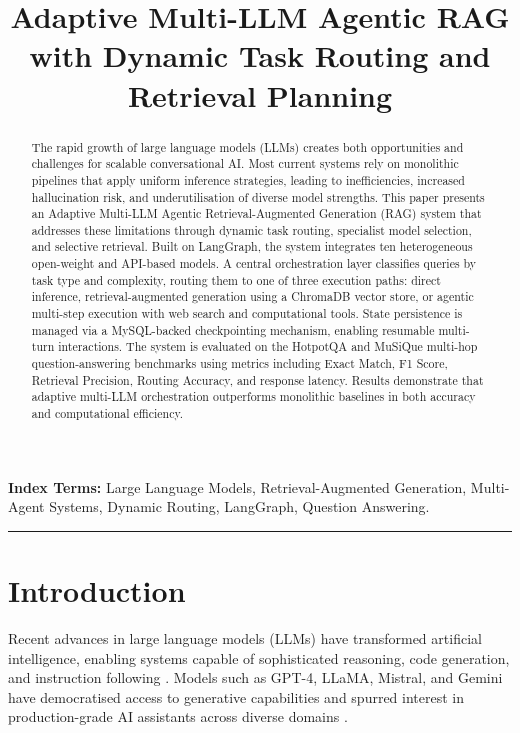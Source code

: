 \documentclass[12pt,a4paper]{article}
\title{
\textbf{Adaptive Multi-LLM Agentic RAG with Dynamic Task Routing and Retrieval Planning}
}
\begin{document}
\maketitle

\begin{abstract}
The rapid growth of large language models (LLMs) creates both opportunities and challenges for scalable conversational AI. Most current systems rely on monolithic pipelines that apply uniform inference strategies, leading to inefficiencies, increased hallucination risk, and underutilisation of diverse model strengths. This paper presents an Adaptive Multi-LLM Agentic Retrieval-Augmented Generation (RAG) system that addresses these limitations through dynamic task routing, specialist model selection, and selective retrieval. Built on LangGraph, the system integrates ten heterogeneous open-weight and API-based models. A central orchestration layer classifies queries by task type and complexity, routing them to one of three execution paths: direct inference, retrieval-augmented generation using a ChromaDB vector store, or agentic multi-step execution with web search and computational tools. State persistence is managed via a MySQL-backed checkpointing mechanism, enabling resumable multi-turn interactions. The system is evaluated on the HotpotQA and MuSiQue multi-hop question-answering benchmarks using metrics including Exact Match, F1 Score, Retrieval Precision, Routing Accuracy, and response latency. Results demonstrate that adaptive multi-LLM orchestration outperforms monolithic baselines in both accuracy and computational efficiency.
\end{abstract}

\noindent \textbf{Index Terms:} Large Language Models, Retrieval-Augmented Generation, Multi-Agent Systems, Dynamic Routing, LangGraph, Question Answering.

\vspace{0.5cm}
\hrule
\vspace{0.5cm}

\section{Introduction}

Recent advances in large language models (LLMs) have transformed artificial intelligence, enabling systems capable of sophisticated reasoning, code generation, and instruction following \cite{brown2020language, wei2022chain}. Models such as GPT-4, LLaMA, Mistral, and Gemini have democratised access to generative capabilities and spurred interest in production-grade AI assistants across diverse domains \cite{touvron2023llama, jiang2023mistral, team2024gemini}.
\end{document}
